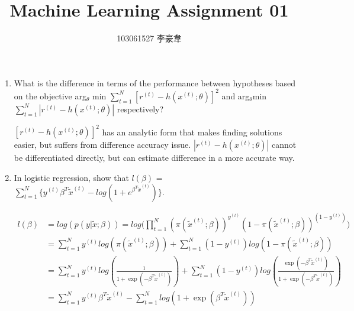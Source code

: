 \documentclass[12pt]{article}
\title{Machine Learning Assignment 01}
\author{103061527 李豪韋}
\date{}
\begin{document}
\maketitle
	\begin {enumerate}
		\item What is the difference in terms of the performance between hypotheses based on the objective 
			arg$_\theta$ min $\displaystyle\sum_{t=1}^N [r^{(t)}-h(x^{(t)};\theta)]^2$ and 
			arg$_\theta$min$\displaystyle\sum_{t=1}^N|r^{(t)}-h(x^{(t)};\theta)|$ respectively?
			
			\noindent\makebox[\linewidth]{\rule{\textwidth}{0.4pt}}
			\begin {flushleft} %
				$[r^{(t)}-h(x^{(t)};\theta)]^2$ has an analytic form that makes finding solutions easier, 
				but suffers from difference accuracy issue. $|r^{(t)}-h(x^{(t)};\theta)|$ cannot be differentiated directly, 
				but can estimate difference in a more accurate way.
			\end {flushleft}
			\noindent\makebox[\linewidth]{\rule{\textwidth}{0.4pt}}
			
		\item In logistic regression, show that $l(\beta)$ = 
			$\displaystyle\sum_{t=1}^N\{y^{(t)}\beta^T\widetilde{x}^{(t)}-log(1+e^{\beta^T\widetilde{x}^{(t)}})\}$.
		
			\noindent\makebox[\linewidth]{\rule{\textwidth}{0.4pt}}
			\begin {flushleft}%
			
				\begin {align*}
					l(\beta) & = log( p( y | \widetilde{x} ; \beta ) ) = log\bigg(
					\displaystyle\prod_{t=1}^N ( \pi ( \widetilde{x}^{(t)} ; \beta ) )^{ y^{(t)} } 
					( 1 - \pi ( \widetilde{x}^{(t)} ; \beta ) )^{ ( 1 - y^{(t)} ) }
					\bigg) \\
					& = \displaystyle\sum_{t=1}^N y^{(t)} log( \pi ( \widetilde{x}^{(t)} ; \beta ) ) +
					\displaystyle\sum_{t=1}^N (1 - y^{(t)}) log(1 - \pi ( \widetilde{x}^{(t)} ; \beta ) ) \\
					& = \displaystyle\sum_{t=1}^N y^{(t)} log( \frac{1}{1 + \exp{(- \beta^T \widetilde{x}^{(t)} )}} ) + 
					\displaystyle\sum_{t=1}^N (1 - y^{(t)}) 
					log( \frac{ \exp{ ( -\beta^T \widetilde{x}^{(t)} ) } }{ 1 + \exp{ ( -\beta^T \widetilde{x}^{(t)} ) } } ) \\
					& = \displaystyle\sum_{t=1}^N y^{(t)} \beta^T \widetilde{x}^{(t)}  -
					\displaystyle\sum_{t=1}^N log( 1 + \exp{ ( \beta^T \widetilde{x}^{(t)} ) } )
				\end {align*}	
				

\end{flushleft}
\end{enumerate}
\end{document}
